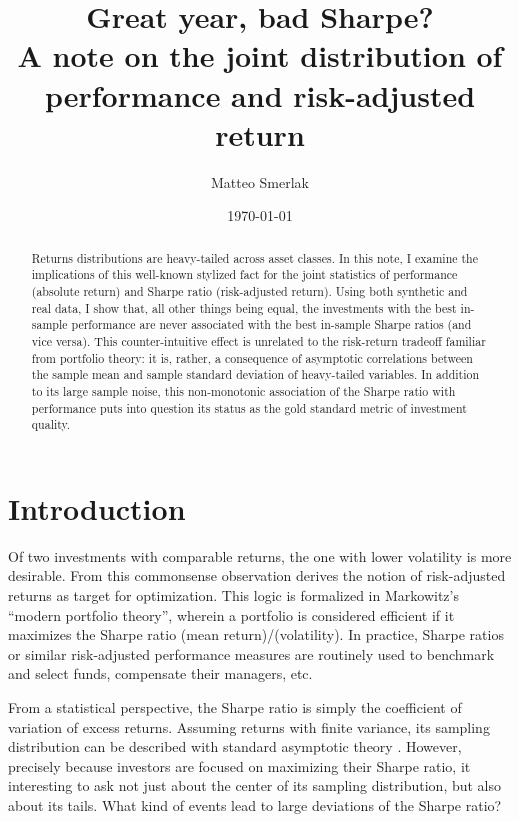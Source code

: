 \documentclass[
reprint,
amsmath,amssymb,
aps,
]{revtex4-2}
\begin{document}
\title{Great year, bad Sharpe?\\ A note on the joint distribution of performance and risk-adjusted return}

\author{Matteo Smerlak}

\date{\today}

\begin{abstract}
    Returns distributions are heavy-tailed across asset classes. 
    In this note, I examine the implications of this well-known stylized fact for the joint statistics of performance (absolute return) and Sharpe ratio (risk-adjusted return). 
    Using both synthetic and real data, I show that, all other things being equal, the investments with the best in-sample performance are never associated with the best in-sample Sharpe ratios (and vice versa). 
    This counter-intuitive effect is unrelated to the risk-return tradeoff familiar from portfolio theory: it is, rather, a consequence of asymptotic correlations between the sample mean and sample standard deviation of heavy-tailed variables. 
    In addition to its large sample noise, this non-monotonic association of the Sharpe ratio with performance puts into question its status as the gold standard metric of investment quality. 
 \end{abstract}

\maketitle 

\section{Introduction}

Of two investments with comparable returns, the one with lower volatility is more desirable. 
From this commonsense observation derives the notion of risk-adjusted returns as target for optimization. 
This logic is formalized in Markowitz's ``modern portfolio theory'', wherein a portfolio is considered efficient if it maximizes the Sharpe ratio (mean return)/(volatility). 
In practice, Sharpe ratios or similar risk-adjusted performance measures are routinely used to benchmark and select funds, compensate their managers, etc.

From a statistical perspective, the Sharpe ratio is simply the coefficient of variation of excess returns. 
Assuming returns with finite variance, its sampling distribution can be described with standard asymptotic theory \cite{loStatistics2002}. 
However, precisely because investors are focused on maximizing their Sharpe ratio, it interesting to ask not just about the center of its sampling distribution, but also about its tails. 
What kind of events lead to large deviations of the Sharpe ratio? 
\end{document}
